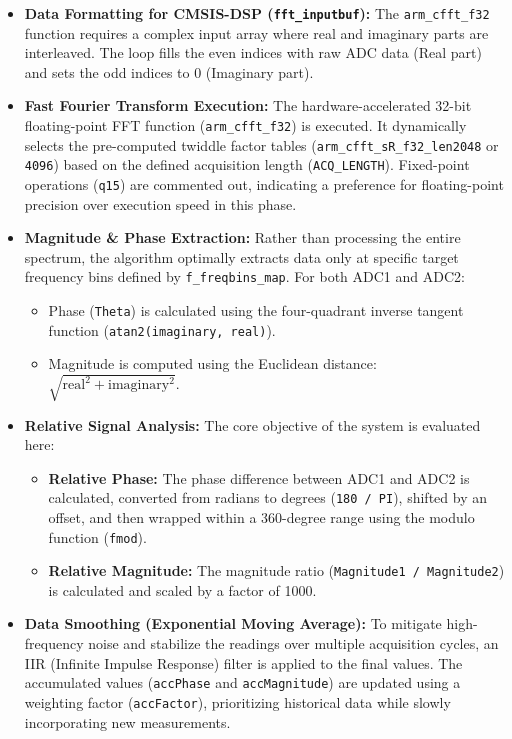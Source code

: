 \begin{itemize}
    \item \textbf{Data Formatting for CMSIS-DSP (\texttt{fft\_inputbuf}):} The \texttt{arm\_cfft\_f32} function requires a complex input array where real and imaginary parts are interleaved. The loop fills the even indices with raw ADC data (Real part) and sets the odd indices to 0 (Imaginary part).
    
    \item \textbf{Fast Fourier Transform Execution:} The hardware-accelerated 32-bit floating-point FFT function (\texttt{arm\_cfft\_f32}) is executed. It dynamically selects the pre-computed twiddle factor tables (\texttt{arm\_cfft\_sR\_f32\_len2048} or \texttt{4096}) based on the defined acquisition length (\texttt{ACQ\_LENGTH}). Fixed-point operations (\texttt{q15}) are commented out, indicating a preference for floating-point precision over execution speed in this phase.
    
    \item \textbf{Magnitude \& Phase Extraction:} Rather than processing the entire spectrum, the algorithm optimally extracts data only at specific target frequency bins defined by \texttt{f\_freqbins\_map}. For both ADC1 and ADC2:
    \begin{itemize}
        \item Phase (\texttt{Theta}) is calculated using the four-quadrant inverse tangent function (\texttt{atan2(imaginary, real)}).
        \item Magnitude is computed using the Euclidean distance: $\sqrt{\mathrm{real}^2 + \mathrm{imaginary}^2}$.
    \end{itemize}
    
    \item \textbf{Relative Signal Analysis:} The core objective of the system is evaluated here:
    \begin{itemize}
        \item \textbf{Relative Phase:} The phase difference between ADC1 and ADC2 is calculated, converted from radians to degrees (\texttt{180 / PI}), shifted by an offset, and then wrapped within a 360-degree range using the modulo function (\texttt{fmod}).
        \item \textbf{Relative Magnitude:} The magnitude ratio (\texttt{Magnitude1 / Magnitude2}) is calculated and scaled by a factor of 1000.
    \end{itemize}
    
    \item \textbf{Data Smoothing (Exponential Moving Average):} To mitigate high-frequency noise and stabilize the readings over multiple acquisition cycles, an IIR (Infinite Impulse Response) filter is applied to the final values. The accumulated values (\texttt{accPhase} and \texttt{accMagnitude}) are updated using a weighting factor (\texttt{accFactor}), prioritizing historical data while slowly incorporating new measurements.
\end{itemize}